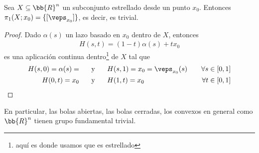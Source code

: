 \begin{ejemplo}
    Sea $X\subseteq \bb{R}^n$ un subconjunto estrellado desde un punto $x_0$. Entonces $\pi_1(X;x_0) = \{[\veps_{x_0}]\}$, es decir, es trivial.

    \begin{proof}
        Dado $\alpha(s)$ un lazo basado en $x_0$ dentro de $X$, entonces 
        \begin{gather*}
            H(s,t) = (1-t)\alpha(s)+tx_0
        \end{gather*}
        es una aplicación continua dentro\footnote{aquí es donde usamos que es estrellado} de $X$ tal que 
        \begin{align*}
            H(s,0) = \alpha(s) = \hspace{0.5cm} &\text{ y } \hspace{0.5cm} H(s,1) = x_0 = \veps_{x_0}(s) \ \ \ &\forall s\in [0,1]\\
            H(0,t) = x_0  \hspace{0.5cm} &\text{ y } \hspace{0.5cm} H(1,t) = x_0\ \ \ &\forall t \in [0,1]
        \end{align*}
    \end{proof}
    En particular, las bolas abiertas, las bolas cerradas, los convexos en general como $\bb{R}^n$ tienen grupo fundamental trivial.
\end{ejemplo}

